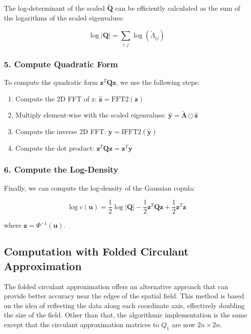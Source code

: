 \documentclass[journal=,manuscript=]{achemso}
\providecommand{\tightlist}{%
  \setlength{\itemsep}{0pt}\setlength{\parskip}{0pt}}\usepackage{longtable,booktabs,array}
\begin{document}
The log-determinant of the scaled \(\mathbf{\tilde Q}\) can be
efficiently calculated as the sum of the logarithms of the scaled
eigenvalues:

\[
\log|\mathbf{Q}| = \sum_{i,j} \log(\tilde \Lambda_{ij})
\]

\subsubsection{5. Compute Quadratic Form}\label{compute-quadratic-form}

To compute the quadratic form \(\mathbf{z}^T\mathbf{Q}\mathbf{z}\), we
use the following steps:

\begin{enumerate}
\def\labelenumi{\alph{enumi}.}
\tightlist
\item
  Compute the 2D FFT of z:
  \(\mathbf{\hat{z}} = \text{FFT2}(\mathbf{z})\)
\item
  Multiply element-wise with the scaled eigenvalues:
  \(\mathbf{\hat{y}} = \boldsymbol{\tilde \Lambda} \odot \mathbf{\hat{z}}\)
\item
  Compute the inverse 2D FFT:
  \(\mathbf{y} = \text{IFFT2}(\mathbf{\hat{y}})\)
\item
  Compute the dot product:
  \(\mathbf{z}^T\mathbf{Q}\mathbf{z} = \mathbf{z}^T\mathbf{y}\)
\end{enumerate}

\subsubsection{6. Compute the
Log-Density}\label{compute-the-log-density}

Finally, we can compute the log-density of the Gaussian copula:

\[
\log c(\mathbf{u}) = \frac{1}{2}\log|\mathbf{Q}| - \frac{1}{2}\mathbf{z}^T\mathbf{Q}\mathbf{z} + \frac{1}{2}\mathbf{z}^T\mathbf{z}
\]

where \(\mathbf{z} = \Phi^{-1}(\mathbf{u})\).

\subsection{Computation with Folded Circulant
Approximation}\label{computation-with-folded-circulant-approximation}

The folded circulant approximation offers an alternative approach that
can provide better accuracy near the edges of the spatial field. This
method is based on the idea of reflecting the data along each coordinate
axis, effectively doubling the size of the field. Other than that, the
algorithmic implementation is the same except that the circulant
approximation matrices to \(Q_1\) are now \(2n \times 2n\).
\end{document}
